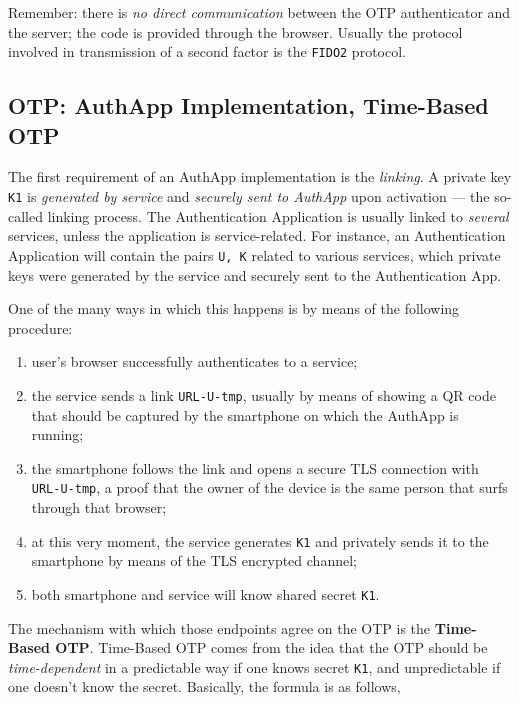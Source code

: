 \documentclass[10pt]{\classname}
\begin{document}
Remember: there is \emph{no direct communication} between the OTP authenticator
and the server; the code is provided through the browser. Usually the protocol
involved in transmission of a second factor is the \texttt{FIDO2} protocol.

\subsection{OTP: AuthApp Implementation, Time\--Based OTP}

The first requirement of an AuthApp implementation is the \emph{linking}. A
private key \texttt{K1} is \emph{generated by service} and \emph{securely sent
to AuthApp} upon activation --- the so\--called linking process. The
Authentication Application is usually linked to \emph{several} services, unless
the application is service\--related. For instance, an Authentication
Application will contain the pairs \texttt{U, K} related to various services,
which private keys were generated by the service and securely sent to the
Authentication App.

One of the many ways in which this happens is by means of the following
procedure:
\begin{enumerate}
    \item user's browser successfully authenticates to a service;
    \item the service sends a link \texttt{URL-U-tmp}, usually by means of
        showing a QR code that should be captured by the smartphone on which
        the AuthApp is running;
    \item the smartphone follows the link and opens a secure TLS connection
        with \texttt{URL-U-tmp},  a proof that the owner of the device is the
        same person that surfs through that browser;
    \item at this very moment, the service generates \texttt{K1} and privately
        sends it to the smartphone by means of the TLS encrypted channel;
    \item both smartphone and service will know shared secret \texttt{K1}.
\end{enumerate}

The mechanism with which those endpoints agree on the OTP is the
\textbf{Time\--Based OTP}. Time\--Based OTP comes from the idea that the OTP
should be \emph{time\--dependent} in a predictable way if one knows secret
\texttt{K1}, and unpredictable if one doesn't know the secret. Basically, the
formula is as follows,
\end{document}
